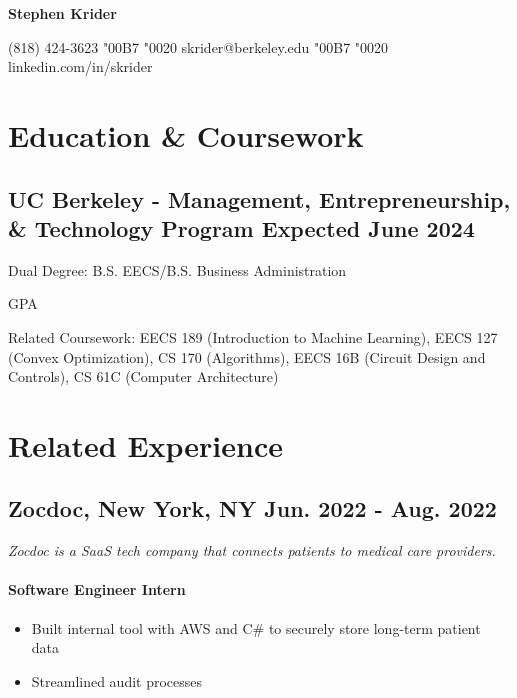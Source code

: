 \documentclass{article}
\begin{document}
	\begin{center}
		{\namefont \fontsize{18}{24}\selectfont \textbf{Stephen Krider}}

		\vspace{0.075in}
		
		(818) 424-3623
		\char"00B7 
		\char"0020
		skrider@berkeley.edu 
		\char"00B7 
		\char"0020
		linkedin.com/in/skrider
	\end{center}
	\vspace{-17pt}
	\section{Education \& Coursework}
	\subsection{
		{\bfseries UC Berkeley - Management, Entrepreneurship, \& Technology Program}
		{\hspace{\fill}\bfseries Expected June 2024}
	}
	Dual Degree: B.S. EECS/B.S. Business Administration

	 GPA

	\noindent Related Coursework: EECS 189 (Introduction to Machine Learning), EECS 127 (Convex Optimization), CS 170 (Algorithms), EECS 16B (Circuit Design and Controls), CS 61C (Computer Architecture)

	\section{Related Experience}

	\subsection{
		\textbf{Zocdoc}, New York, NY
		{\hspace{\fill}\bfseries Jun. 2022 - Aug. 2022}
	}
	{\itshape Zocdoc is a SaaS tech company that connects patients to medical care providers.}
	\paragraph{Software Engineer Intern}
	\begin{itemize}
		\item Built internal tool with AWS and C\# to securely store long-term patient data
		\item Streamlined audit processes
	\end{itemize}
\end{document}

